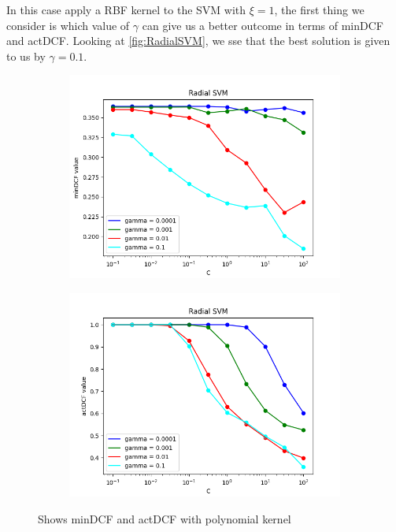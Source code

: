 In this case apply a RBF kernel to the SVM with \(\xi=1\), the first thing we consider is which value of \(\gamma\) can
give us a better outcome in terms of minDCF and actDCF.
Looking at \autoref{fig:RadialSVM}, we sse that the best solution is given to us by \(\gamma=0.1\).

\begin{figure}[h!]
    \centering
    \begin{subfigure}[b]{0.40\linewidth}
        \includegraphics[width=\linewidth]{Lab/09. Lab 09/Images/07. Radial - minDCF}
        \label{fig:RadialminDCF}
    \end{subfigure}
    \begin{subfigure}[b]{0.40\linewidth}
        \includegraphics[width=\linewidth]{Lab/09. Lab 09/Images/08. Radial - actDCF}
        \label{fig:RadialactDCF}
    \end{subfigure}
    \caption{Shows minDCF and actDCF with polynomial kernel}
    \label{fig:RadialSVM}
\end{figure}

